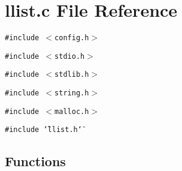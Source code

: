 \section{llist.c File Reference}
\label{llist_8c}
{\tt \#include $<$config.h$>$}\par
{\tt \#include $<$stdio.h$>$}\par
{\tt \#include $<$stdlib.h$>$}\par
{\tt \#include $<$string.h$>$}\par
{\tt \#include $<$malloc.h$>$}\par
{\tt \#include \char`\"{}llist.h\char`\"{}}\par
\subsection*{Functions}

